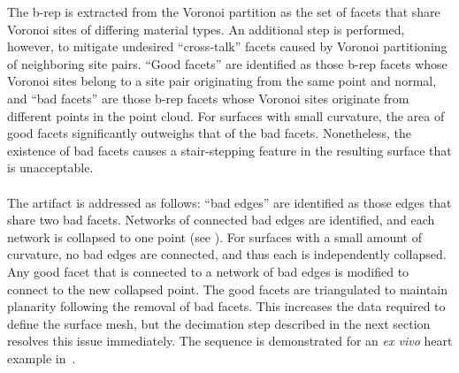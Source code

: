 The b-rep is extracted from the Voronoi partition as the set of facets that share Voronoi sites of differing material types. An additional step is performed, however, to mitigate undesired ``cross-talk'' facets caused by Voronoi partitioning of neighboring site pairs. ``Good facets'' are identified as those b-rep facets whose Voronoi sites belong to a site pair originating from the same point and normal, and ``bad facets'' are those b-rep facets whose Voronoi sites originate from different points in the point cloud. For surfaces with small curvature, the area of good facets significantly outweighs that of the bad facets. Nonetheless, the existence of bad facets causes a stair-stepping feature in the resulting surface that is unacceptable. \\ \\
%
The artifact is addressed as follows: ``bad edges'' are identified as those edges that share two bad facets. Networks of connected bad edges are identified, and each network is collapsed to one point (see ). For surfaces with a small amount of curvature, no bad edges are connected, and thus each is independently collapsed. Any good facet that is connected to a network of bad edges is modified to connect to the new collapsed point. The good facets are triangulated to maintain planarity following the removal of bad facets. This increases the data required to define the surface mesh, but the decimation step described in the next section resolves this issue immediately. The sequence is demonstrated for an \textit{ex vivo} heart example in~. \\

